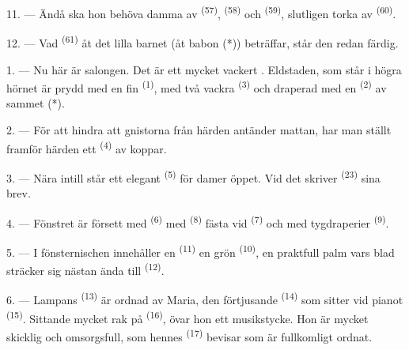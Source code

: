 

11. --- Ändå ska hon behöva damma av  \textsuperscript{(57)},
 \textsuperscript{(58)} och
 \textsuperscript{(59)}, slutligen torka av 
\textsuperscript{(60)}.

12. --- Vad  \textsuperscript{(61)} åt det lilla barnet (åt babon (*))
beträffar, står den redan färdig.

\VUsaut{5.0mm}
\VUsaut{3.0mm}

1. --- Nu här är salongen. Det är ett mycket vackert . Eldstaden, som står i högra
hörnet är prydd med en fin  \textsuperscript{(1)}, med två vackra
 \textsuperscript{(3)} och draperad med en 
\textsuperscript{(2)} av sammet (*).

2. --- För att hindra att gnistorna från härden antänder mattan, har man ställt framför härden
ett  \textsuperscript{(4)} av koppar.

3. --- Nära intill står ett elegant  \textsuperscript{(5)} för damer öppet.
Vid det skriver  \textsuperscript{(23)} sina brev.

4. --- Fönstret är försett med  \textsuperscript{(6)} med
 \textsuperscript{(8)} fästa vid 
\textsuperscript{(7)} och med tygdraperier  \textsuperscript{(9)}.

5. --- I fönsternischen innehåller en  \textsuperscript{(11)} en grön
 \textsuperscript{(10)}, en praktfull palm vars blad sträcker sig nästan ända
till  \textsuperscript{(12)}.

6. --- Lampans  \textsuperscript{(13)} är ordnad av Maria, den förtjusande
 \textsuperscript{(14)} som sitter vid pianot \textsuperscript{(15)}.
Sittande mycket rak på  \textsuperscript{(16)}, övar hon ett musikstycke. Hon
är mycket skicklig och omsorgsfull, som hennes  \textsuperscript{(17)} bevisar
som är fullkomligt ordnat.

